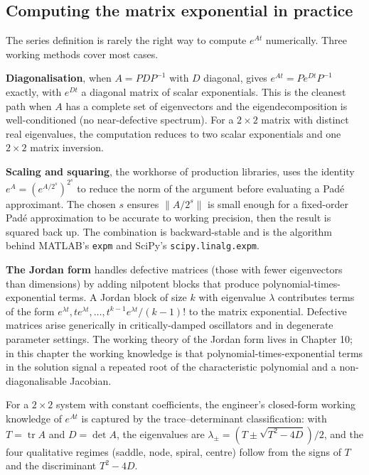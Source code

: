 \subsection{Computing the matrix exponential in practice}

The series definition is rarely the right way to compute $e^{A t}$
numerically. Three working methods cover most cases.

\textbf{Diagonalisation}, when $A = P D P^{-1}$ with $D$ diagonal,
gives $e^{A t} = P e^{D t} P^{-1}$ exactly, with $e^{D t}$ a
diagonal matrix of scalar exponentials. This is the cleanest path
when $A$ has a complete set of eigenvectors and the eigendecomposition
is well-conditioned (no near-defective spectrum). For a $2 \times
2$ matrix with distinct real eigenvalues, the computation reduces
to two scalar exponentials and one $2 \times 2$ matrix inversion.

\textbf{Scaling and squaring}, the workhorse of production
libraries, uses the identity $e^{A} = (e^{A/2^{s}})^{2^{s}}$ to
reduce the norm of the argument before evaluating a Pad\'e
approximant. The chosen $s$ ensures $\|A/2^{s}\|$ is small enough
for a fixed-order Pad\'e approximation to be accurate to working
precision, then the result is squared back up. The combination is
backward-stable and is the algorithm behind MATLAB's \verb|expm|
and SciPy's \verb|scipy.linalg.expm|.

\textbf{The Jordan form} handles defective matrices (those with
fewer eigenvectors than dimensions) by adding nilpotent blocks
that produce polynomial-times-exponential terms. A Jordan block of
size $k$ with eigenvalue $\lambda$ contributes terms of the form
$e^{\lambda t}, t e^{\lambda t}, \ldots, t^{k-1} e^{\lambda t}/(k-1)!$
to the matrix exponential. Defective matrices arise generically in
critically-damped oscillators and in degenerate parameter settings.
The working theory of the Jordan form lives in Chapter 10; in this
chapter the working knowledge is that polynomial-times-exponential
terms in the solution signal a repeated root of the characteristic
polynomial and a non-diagonalisable Jacobian.

For a $2 \times 2$ system with constant coefficients, the engineer's
closed-form working knowledge of $e^{A t}$ is captured by the
trace--determinant classification: with $T = \operatorname{tr} A$
and $D = \det A$, the eigenvalues are
$\lambda_{\pm} = (T \pm \sqrt{T^{2} - 4 D})/2$, and the four
qualitative regimes (saddle, node, spiral, centre) follow from the
signs of $T$ and the discriminant $T^{2} - 4 D$.

